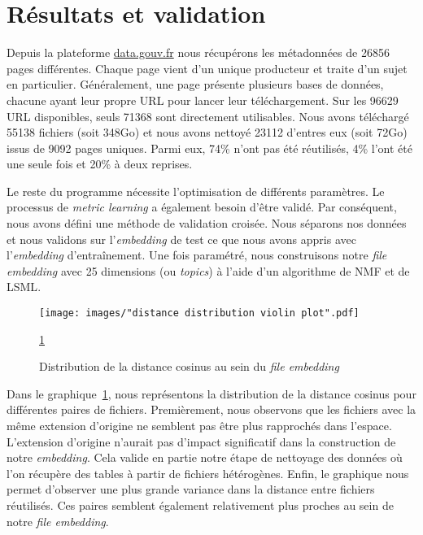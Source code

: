 \documentclass[a4paper]{article}
\begin{document}
	\section{Résultats et validation}
	
	Depuis la plateforme \href{http://www.data.gouv.fr/fr/}{data.gouv.fr} nous récupérons les métadonnées de 26856 pages différentes. Chaque page vient d'un unique producteur et traite d'un sujet en particulier. Généralement, une page présente plusieurs bases de données, chacune ayant leur propre URL pour lancer leur téléchargement. Sur les 96629 URL disponibles, seuls 71368 sont directement utilisables. Nous avons téléchargé 55138 fichiers (soit 348Go) et nous avons nettoyé 23112 d'entres eux (soit 72Go) issus de 9092 pages uniques. Parmi eux, 74\% n'ont pas été réutilisés, 4\% l'ont été une seule fois et 20\% à deux reprises. 
	
	Le reste du programme nécessite l'optimisation de différents paramètres. Le processus de \emph{metric learning} a également besoin d'être validé. Par conséquent, nous avons défini une méthode de validation croisée. Nous séparons nos données et nous validons sur l'\emph{embedding} de test ce que nous avons appris avec l'\emph{embedding} d'entraînement. Une fois paramétré, nous construisons notre \emph{file embedding} avec 25 dimensions (ou \emph{topics}) à l'aide d'un algorithme de \ac{NMF} et de \ac{LSML}.
	
	\begin{figure}
		\centering
		\texttt{[image: images/"distance distribution violin plot".pdf]}
		\caption{Distribution de la distance cosinus au sein du \emph{file embedding}}
		\ref{fig:distance-distribution}
		\label{fig:distance-distribution}
	\end{figure}
	
	Dans le graphique~\ref{fig:distance-distribution}, nous représentons la distribution de la distance cosinus pour différentes paires de fichiers. Premièrement, nous observons que les fichiers avec la même extension d'origine ne semblent pas être plus rapprochés dans l'espace. L'extension d'origine n'aurait pas d'impact significatif dans la construction de notre \emph{embedding}. Cela valide en partie notre étape de nettoyage des données où l'on récupère des tables à partir de fichiers hétérogènes. Enfin, le graphique nous permet d'observer une plus grande variance dans la distance entre fichiers réutilisés. Ces paires semblent également relativement plus proches au sein de notre \emph{file embedding}.
	
\end{document}
